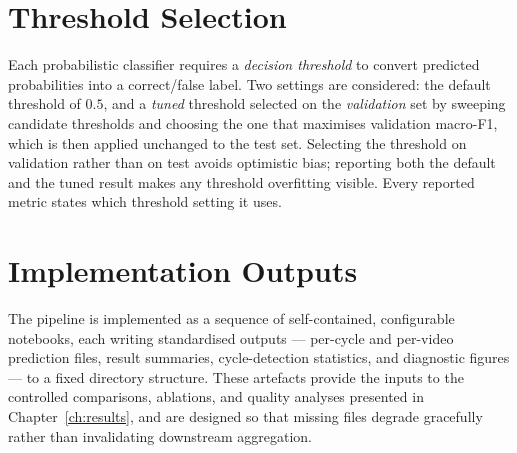 \section{Threshold Selection}
\label{sec:method-threshold}

Each probabilistic classifier requires a \emph{decision threshold} to convert
predicted probabilities into a correct/false label. Two settings are
considered: the default threshold of $0.5$, and a \emph{tuned} threshold
selected on the \emph{validation} set by sweeping candidate thresholds and
choosing the one that maximises validation macro-F1, which is then applied
unchanged to the test set. Selecting the threshold on validation rather than on
test avoids optimistic bias; reporting both the default and the tuned result
makes any threshold overfitting visible. Every reported metric states which
threshold setting it uses.

\section{Implementation Outputs}
\label{sec:method-outputs}

The pipeline is implemented as a sequence of self-contained, configurable
notebooks, each writing standardised outputs --- per-cycle and per-video
prediction files, result summaries, cycle-detection statistics, and diagnostic
figures --- to a fixed directory structure. These artefacts provide the inputs
to the controlled comparisons, ablations, and quality analyses presented in
Chapter~\ref{ch:results}, and are designed so that missing files degrade
gracefully rather than invalidating downstream aggregation.

